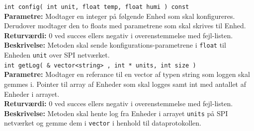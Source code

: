 \verb+int config( int unit, float temp, float humi ) const +\\
\textbf{Parametre:} Modtager en integer på følgende Enhed som skal konfigureres. Derudover modtager den to floats med parametrene som skal skrives til Enhed. \\
\textbf{Returværdi:}  0 ved succes ellers negativ i overenstemmelse med fejl-listen.   \\
\textbf{Beskrivelse:} Metoden skal sende konfigurations-parametrene i \verb+float+ til Enheden \verb+unit+ over SPI netværket.\\

\verb+int getLog( & vector<string> , int * units, int size )+ \\
\textbf{Parametre:}  Modtager en referance til en vector af typen string som loggen skal gemmes i. Pointer til array af Enheder som skal logges samt int med antallet af Enheder i arrayet. \\
\textbf{Returværdi:}  0 ved succes ellers negativ i overenstemmelse med fejl-listen.   \\
\textbf{Beskrivelse:} Metoden skal hente log fra Enheder i arrayet \verb+units+ på SPI netværket og gemme dem i \verb+vector+ i henhold til dataprotokollen. \\
